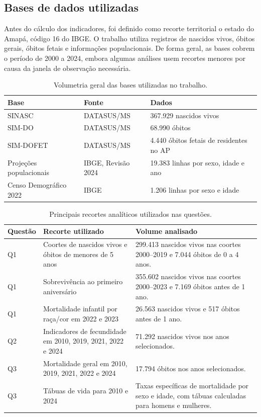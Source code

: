 \subsection{Bases de dados utilizadas}

Antes do cálculo dos indicadores, foi definido como recorte territorial o estado do Amapá, código 16 do IBGE. O trabalho utiliza registros de nascidos vivos, óbitos gerais, óbitos fetais e informações populacionais. De forma geral, as bases cobrem o período de 2000 a 2024, embora algumas análises usem recortes menores por causa da janela de observação necessária.

\begin{table}[H]
\centering
\small
\caption{Volumetria geral das bases utilizadas no trabalho.}
\label{tab:volumetria_bases}
\begin{tabular}{p{3.8cm}p{3.5cm}p{5.5cm}}
\toprule
\textbf{Base} & \textbf{Fonte} & \textbf{Dados} \\
\midrule
SINASC & DATASUS/MS & 367.929 nascidos vivos \\
SIM-DO & DATASUS/MS & 68.990 óbitos \\
SIM-DOFET & DATASUS/MS & 4.440 óbitos fetais de residentes no AP \\
Projeções populacionais & IBGE, Revisão 2024 & 19.383 linhas por sexo, idade e ano \\
Censo Demográfico 2022 & IBGE & 1.206 linhas por sexo e idade \\
\bottomrule
\end{tabular}
\end{table}

\begin{table}[H]
\centering
\small
\caption{Principais recortes analíticos utilizados nas questões.}
\label{tab:recortes_analiticos}
\begin{tabular}{p{2cm}p{7.2cm}p{5cm}}
\toprule
\textbf{Questão} & \textbf{Recorte utilizado} & \textbf{Volume analisado} \\
\midrule
Q1 & Coortes de nascidos vivos e óbitos de menores de 5 anos & 299.413 nascidos vivos nas coortes 2000--2019 e 7.044 óbitos de 0 a 4 anos. \\
Q1 & Sobrevivência ao primeiro aniversário & 355.602 nascidos vivos nas coortes 2000--2023 e 7.169 óbitos antes de 1 ano. \\
Q1 & Mortalidade infantil por raça/cor em 2022 e 2023 & 26.563 nascidos vivos e 517 óbitos antes de 1 ano. \\
Q2 & Indicadores de fecundidade em 2010, 2019, 2021, 2022 e 2024 & 71.292 nascidos vivos nos anos selecionados. \\
Q3 & Mortalidade geral em 2010, 2019, 2021, 2022 e 2024 & 17.794 óbitos nos anos selecionados. \\
Q3 & Tábuas de vida para 2010 e 2024 & Taxas específicas de mortalidade por sexo e idade, com tábuas calculadas para homens e mulheres. \\
\bottomrule
\end{tabular}
\end{table}


